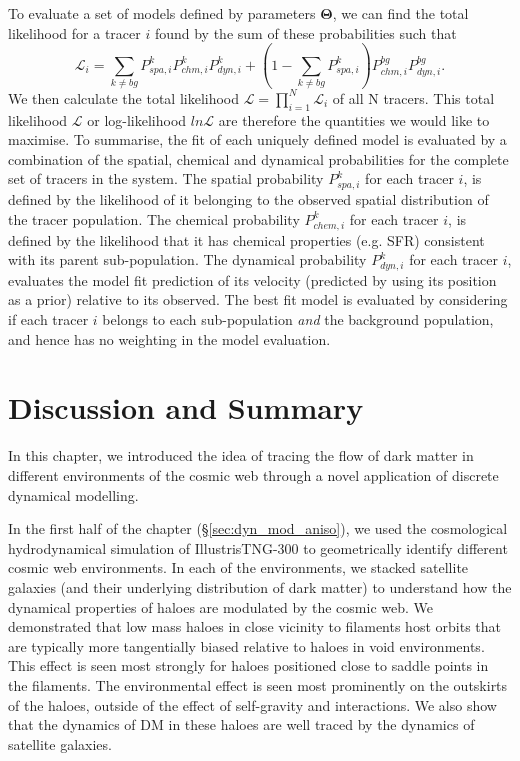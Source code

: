 To evaluate a set of models defined by parameters $\boldsymbol{\Theta}$, we can find the total likelihood for a tracer $i$ found by the sum of these probabilities such that
\begin{equation}
\mathcal{L}_i = \sum_{k \neq bg} P^{k}_{spa,i} P^{k}_{chm,i} P^{k}_{dyn,i} + \left(1 - \sum_{k \neq bg} P^{k}_{spa,i} \right) P^{bg}_{chm,i} P^{bg}_{dyn,i}.
\end{equation}
We then calculate the total likelihood $\mathcal{L} = \prod^N_{i=1} \mathcal{L}_i$ of all N tracers. This total likelihood $\mathcal{L}$ or log-likelihood $ln \mathcal{L}$ are therefore the quantities we would like to maximise. To summarise, the fit of each uniquely defined model is evaluated by a combination of the spatial, chemical and dynamical probabilities for the complete set of tracers in the system. The spatial probability $P^{k}_{spa,i}$ for each tracer $i$, is defined by the likelihood of it belonging to the observed spatial distribution of the tracer population. The chemical probability $P^{k}_{chem,i}$ for each tracer $i$, is defined by the likelihood that it has chemical properties (e.g. SFR) consistent with its parent sub-population. The dynamical probability $P^{k}_{dyn,i}$ for each tracer $i$, evaluates the model fit prediction of its velocity (predicted by using its position as a prior) relative to its observed. The best fit model is evaluated by considering if each tracer $i$ belongs to each sub-population \textit{and} the background population, and hence has no weighting in the model evaluation.

\section{Discussion and Summary} \label{sec:dyn_mod_conclusions}
In this chapter, we introduced the idea of tracing the flow of dark matter in different environments of the cosmic web through a novel application of discrete dynamical modelling. 

In the first half of the chapter (\S\ref{sec:dyn_mod_aniso}), we used the cosmological hydrodynamical simulation of IllustrisTNG-300 to geometrically identify different cosmic web environments. In each of the environments, we stacked satellite galaxies (and their underlying distribution of dark matter) to understand how the dynamical properties of haloes are modulated by the cosmic web. We demonstrated that low mass haloes in close vicinity to filaments host orbits that are typically more tangentially biased relative to haloes in void environments. This effect is seen most strongly for haloes positioned close to saddle points in the filaments. The environmental effect is seen most prominently on the outskirts of the haloes, outside of the effect of self-gravity and interactions. We also show that the dynamics of DM in these haloes are well traced by the dynamics of satellite galaxies. 


